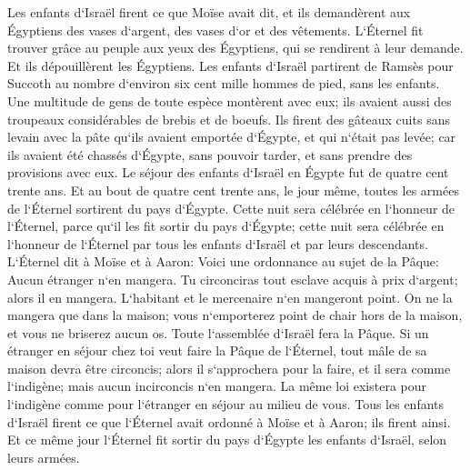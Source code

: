 \verse Les enfants d`Israël firent ce que Moïse avait dit, et ils demandèrent aux Égyptiens des vases d`argent, des vases d`or et des vêtements. 
\verse L`Éternel fit trouver grâce au peuple aux yeux des Égyptiens, qui se rendirent à leur demande. Et ils dépouillèrent les Égyptiens. 
\verse Les enfants d`Israël partirent de Ramsès pour Succoth au nombre d`environ six cent mille hommes de pied, sans les enfants. 
\verse Une multitude de gens de toute espèce montèrent avec eux; ils avaient aussi des troupeaux considérables de brebis et de boeufs. 
\verse Ils firent des gâteaux cuits sans levain avec la pâte qu`ils avaient emportée d`Égypte, et qui n`était pas levée; car ils avaient été chassés d`Égypte, sans pouvoir tarder, et sans prendre des provisions avec eux. 
\verse Le séjour des enfants d`Israël en Égypte fut de quatre cent trente ans. 
\verse Et au bout de quatre cent trente ans, le jour même, toutes les armées de l`Éternel sortirent du pays d`Égypte. 
\verse Cette nuit sera célébrée en l`honneur de l`Éternel, parce qu`il les fit sortir du pays d`Égypte; cette nuit sera célébrée en l`honneur de l`Éternel par tous les enfants d`Israël et par leurs descendants. 
\verse L`Éternel dit à Moïse et à Aaron: Voici une ordonnance au sujet de la Pâque: Aucun étranger n`en mangera. 
\verse Tu circonciras tout esclave acquis à prix d`argent; alors il en mangera. 
\verse L`habitant et le mercenaire n`en mangeront point. 
\verse On ne la mangera que dans la maison; vous n`emporterez point de chair hors de la maison, et vous ne briserez aucun os. 
\verse Toute l`assemblée d`Israël fera la Pâque. 
\verse Si un étranger en séjour chez toi veut faire la Pâque de l`Éternel, tout mâle de sa maison devra être circoncis; alors il s`approchera pour la faire, et il sera comme l`indigène; mais aucun incirconcis n`en mangera. 
\verse La même loi existera pour l`indigène comme pour l`étranger en séjour au milieu de vous. 
\verse Tous les enfants d`Israël firent ce que l`Éternel avait ordonné à Moïse et à Aaron; ils firent ainsi. 
\verse Et ce même jour l`Éternel fit sortir du pays d`Égypte les enfants d`Israël, selon leurs armées. 

\chapter{}

